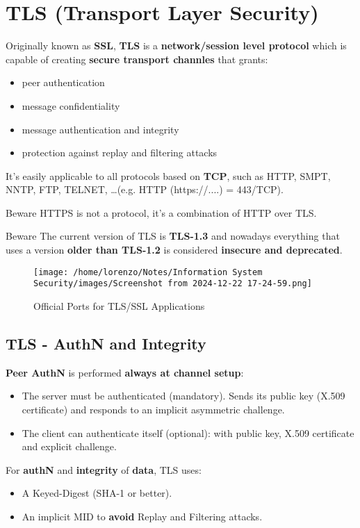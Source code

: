 \section{TLS (Transport Layer Security)}
Originally known as \textbf{SSL}, \textbf{TLS} is a \textbf{network/session level protocol} which is capable of creating \textbf{secure transport channles} that grants:
\begin{itemize}
    \item peer authentication
    \item message confidentiality
    \item message authentication and integrity
    \item protection against replay and filtering attacks
\end{itemize}
It's easily applicable to all protocols based on \textbf{TCP}, such as HTTP, SMPT, NNTP, FTP, TELNET, \dots (e.g. HTTP (https://....) = 443/TCP).    
\begin{quotebox-yellow}{Beware}
        HTTPS is not a protocol, it's a combination of HTTP over TLS. 
\end{quotebox-yellow}
\begin{quotebox-red}{Beware}
    The current version of TLS is \textbf{TLS-1.3} and nowadays everything that uses a version \textbf{older than TLS-1.2} is considered \textbf{insecure and deprecated}.
\end{quotebox-red}

\begin{figure}[H]
    \centering
    \texttt{[image: /home/lorenzo/Notes/Information System Security/images/Screenshot from 2024-12-22 17-24-59.png]}
    \caption{Official Ports for TLS/SSL Applications}
\end{figure}

\subsection{TLS - AuthN and Integrity}
\textbf{Peer AuthN} is performed \textbf{always at channel setup}:
\begin{itemize}
    \item The server must be authenticated (mandatory). Sends its public key (X.509 certificate) and responds to an implicit asymmetric challenge.
    \item The client can authenticate itself (optional): with public key, X.509 certificate and explicit challenge. 
\end{itemize}
For \textbf{authN} and \textbf{integrity} of \textbf{data}, TLS uses:
\begin{itemize}
    \item A Keyed-Digest (SHA-1 or better).
    \item An implicit MID to \textbf{avoid} Replay and Filtering attacks.
\end{itemize}

